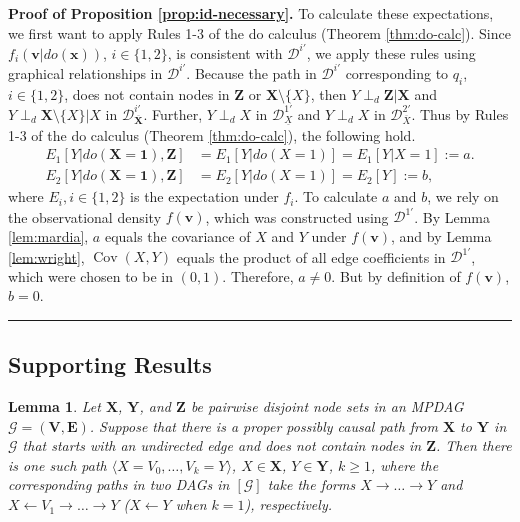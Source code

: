 \documentclass[11pt]{article}
\DeclareMathOperator{\Cov}{Cov}
\newcommand{\BlackBox}{\rule{1.5ex}{1.5ex}}  %
\newtheorem{lemma}[theorem]{Lemma}
\newcommand{\mb}[1]{\mathbf{#1}}
\newcommand{\dsepp}{\perp_{d}}
\newcommand{\g}[1][G]{\mathcal{#1}}
\newenvironment{proofof}[1][]{\noindent \textbf{Proof of #1.}}{\hfill\BlackBox}
\begin{document}
\begin{proofof}[Proposition \ref{prop:id-necessary}]
    To calculate these expectations, we first want to apply Rules 1-3 of the do calculus (Theorem \ref{thm:do-calc}). Since $f_i(\mb{v} | do(\mb{x}))$, $i \in \{1,2\}$, is consistent with $\g[D]^{i'}$, we apply these rules using graphical relationships in $\g[D]^{i'}$. Because the path in $\g[D]^{i'}$ corresponding to $q_i$, $i \in \{1,2\}$, does not contain nodes in $\mb{Z}$ or $\mb{X} \setminus \{X\}$, then $Y \dsepp \mb{Z} | \mb{X}$ and $Y \dsepp \mb{X} \setminus \{X\} | X$ in $\g[D]^{i'}_{\overline{\mb{X}}}$. Further, $Y \dsepp X$ in $\g[D]^{1'}_{\underline{X}}$ and $Y \dsepp X$ in $\g[D]^{2'}_{\overline{X}}$. Thus by Rules 1-3 of the do calculus (Theorem \ref{thm:do-calc}), the following hold.
    \begin{align*}
        E_1[Y | do(\mb{X}=\mb{1}), \mb{Z}] &= E_1[Y | do(X=1)] = E_1[Y|X=1] := a.\\
        E_2[Y | do(\mb{X}=\mb{1}), \mb{Z}] &= E_2[Y | do(X=1)] = E_2[Y] := b,
    \end{align*}    
    where $E_i, i \in \{1,2\}$ is the expectation under $f_i$. To calculate $a$ and $b$, we rely on the observational density $f(\mb{v})$, which was constructed using $\g[D]^{1'}$. By Lemma \ref{lem:mardia}, $a$ equals the covariance of $X$ and $Y$ under $f(\mb{v})$, and by Lemma \ref{lem:wright}, $\Cov(X,Y)$ equals the product of all edge coefficients in $\g[D]^{1'}$, which were chosen to be in $(0,1)$. Therefore, $a \neq 0$. But by definition of $f(\mb{v})$, $b=0$.    
\end{proofof}



\subsection{Supporting Results}

\begin{lemma}
\label{lem:twopaths-corrollary}
    Let $\mb{X}$, $\mb{Y}$, and $\mb{Z}$ be pairwise disjoint node sets in an MPDAG $\g=(\mb{V},\mb{E})$. Suppose that there is a proper possibly causal path from $\mb{X}$ to $\mb{Y}$ in $\g$ that starts with an undirected edge and does not contain nodes in $\mb{Z}$. Then there is one such path $\langle X=V_0, \dots, V_k=Y \rangle$, $X \in \mb{X}$, $Y \in \mb{Y}$, $k \ge 1$, where the corresponding paths in two DAGs in $[\g]$ take the forms $X \to \dots \to Y$ and $X \gets V_1 \to \dots \to Y$ ($X \gets Y$ when $k=1$), respectively.
\end{lemma}
\end{document}
